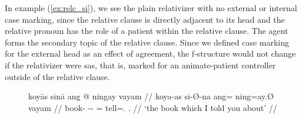 In example (\ref{ex:relc_si}), we see the plain relativizer  with
no external or internal case marking, since the relative clause is directly
adjacent to its head and the relative pronoun has the role of a patient within
the relative clause. The agent forms the secondary topic of the relative
clause. Since we defined case marking for the external head as an effect of
agreement, the f-structure would not change if the relativizer were 
{sas}, that is, marked for an animate-patient controller outside of the
relative clause.

\begin{figure}
\ex\label{ex:relc_siintcase}
\begin{minipage}[t]{.5\remaining}
\begingl
	\gla koyās sinā ang @ ningay vayam //
	\glb koya-as si-Ø-na ang= ning=ay.Ø vayam //
	\glc book-\Parg{} \Rel{}-\Parg{}-\Gen{} \AgtT{}= tell=\Fsg{}.\Top{} 
		\Second{}.\Dat{} //
	\glft `the book which I told you about' //
\endgl
\medskip
\vspace{2em}
\end{minipage}
\end{figure}
